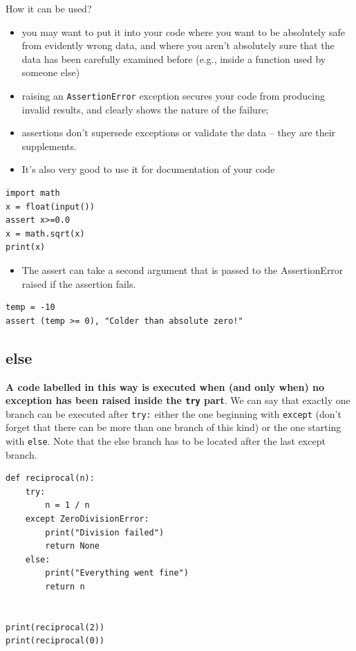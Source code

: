 \documentclass[11pt]{article}
\begin{document}
How it can be used?
\begin{itemize}
\item you may want to put it into your code where you want to be
absolutely safe from evidently wrong data, and where you aren’t
absolutely sure that the data has been carefully examined before
(e.g., inside a function used by someone else)
\item raising an \texttt{AssertionError} exception secures your code from producing
invalid results, and clearly shows the nature of the failure;
\item assertions don’t supersede exceptions or validate the data – they
are their supplements.
\item It's also very good to use it for documentation of your code
\end{itemize}

\begin{verbatim}
import math
x = float(input())
assert x>=0.0
x = math.sqrt(x)
print(x)
\end{verbatim}

\begin{itemize}
\item The assert can take a second argument that is passed to the
AssertionError raised if the assertion fails.
\end{itemize}

\begin{verbatim}
temp = -10
assert (temp >= 0), "Colder than absolute zero!"
\end{verbatim}

\subsection{else}
\label{sec:orgf6677d5}
\textbf{A code labelled in this way is executed when (and only when) no}
\textbf{exception has been raised inside the \texttt{try} part}.  We can say that
exactly one branch can be executed after \texttt{try:} either the one
beginning with \texttt{except} (don’t forget that there can be more than one
branch of this kind) or the one starting with \texttt{else}. Note that the
else branch has to be located after the last except branch.

\begin{verbatim}
def reciprocal(n):
	try:
		n = 1 / n
	except ZeroDivisionError:
		print("Division failed")
		return None
	else:
		print("Everything went fine")
		return n


print(reciprocal(2))
print(reciprocal(0))
\end{verbatim}
\end{document}
